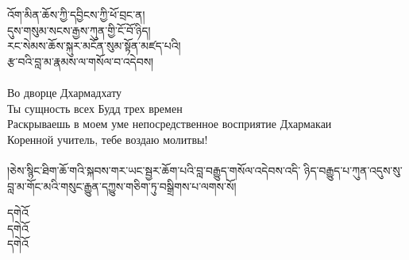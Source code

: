 







{\ti
འོག་མིན་ཆོས་ཀྱི་དབྱིངས་ཀྱི་ཕོ་བྲང་ན། \\
དུས་གསུམ་སངས་རྒྱས་ཀུན་གྱི་ངོ་བོ་ཉིད། \\
རང་སེམས་ཆོས་སྐུར་མངོན་སུམ་སྟོན་མཛད་པའི། \\
རྩ་བའི་བླ་མ་རྣམས་ལ་གསོལ་བ་འདེབས།}\\
\\
\ru
Во дворце Дхармадхату\\
Ты сущность всех Будд трех времен\\
Раскрываешь в моем уме непосредственное восприятие Дхармакаи \\
Коренной учитель, тебе воздаю молитвы!\\
\\


{\ti །ཅེས་སྙིང་ཐིག་ཆོ་གའི་སྐབས་གར་ཡང་སྦྱར་ཆོག་པའི་བླ་བརྒྱུད་གསོལ་འདེབས་འདི་
ཉིད་བརྒྱུད་པ་ཀུན་འདུས་སུ་བླ་མ་གོང་མའི་གསུང་རྒྱུན་དཀྱུས་གཅིག་ཏུ་བསྒྲིགས་པ་ལགས་སོ།}

{\ti
དགེའོ\\
དགེའོ\\
དགེའོ}\\

